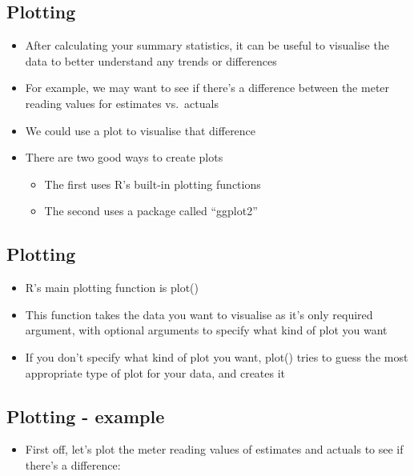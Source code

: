 \documentclass[]{article}
\providecommand{\tightlist}{%
  \setlength{\itemsep}{0pt}\setlength{\parskip}{0pt}}
\begin{document}
\subsection{Plotting}\label{plotting}

\begin{itemize}
\tightlist
\item
  After calculating your summary statistics, it can be useful to
  visualise the data to better understand any trends or differences
\item
  For example, we may want to see if there's a difference between the
  meter reading values for estimates vs.~actuals
\item
  We could use a plot to visualise that difference
\item
  There are two good ways to create plots

  \begin{itemize}
  \tightlist
  \item
    The first uses R's built-in plotting functions
  \item
    The second uses a package called ``ggplot2''
  \end{itemize}
\end{itemize}

\subsection{Plotting}\label{plotting-1}

\begin{itemize}
\tightlist
\item
  R's main plotting function is plot()
\item
  This function takes the data you want to visualise as it's only
  required argument, with optional arguments to specify what kind of
  plot you want
\item
  If you don't specify what kind of plot you want, plot() tries to guess
  the most appropriate type of plot for your data, and creates it
\end{itemize}

\subsection{Plotting - example}\label{plotting---example}

\begin{itemize}
\tightlist
\item
  First off, let's plot the meter reading values of estimates and
  actuals to see if there's a difference:
\end{itemize}
\end{document}
